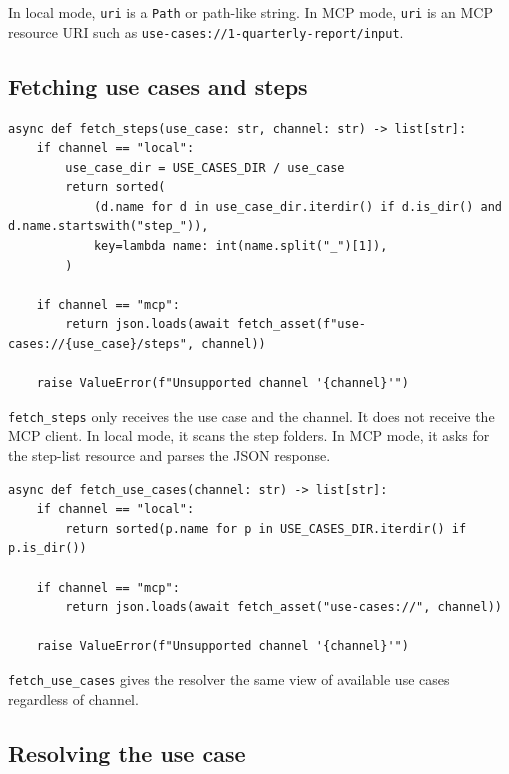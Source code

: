 \documentclass[12pt, a4paper]{article}
\begin{document}
In local mode, \texttt{uri} is a \texttt{Path} or path-like string. In MCP mode, \texttt{uri} is an MCP resource URI such as \texttt{use-cases://1-quarterly-report/input}.

\subsection{Fetching use cases and steps}

\begin{lstlisting}[style=pythonstyle]
async def fetch_steps(use_case: str, channel: str) -> list[str]:
    if channel == "local":
        use_case_dir = USE_CASES_DIR / use_case
        return sorted(
            (d.name for d in use_case_dir.iterdir() if d.is_dir() and d.name.startswith("step_")),
            key=lambda name: int(name.split("_")[1]),
        )

    if channel == "mcp":
        return json.loads(await fetch_asset(f"use-cases://{use_case}/steps", channel))

    raise ValueError(f"Unsupported channel '{channel}'")
\end{lstlisting}

\texttt{fetch\_steps} only receives the use case and the channel. It does not receive the MCP client. In local mode, it scans the step folders. In MCP mode, it asks for the step-list resource and parses the JSON response.

\begin{lstlisting}[style=pythonstyle]
async def fetch_use_cases(channel: str) -> list[str]:
    if channel == "local":
        return sorted(p.name for p in USE_CASES_DIR.iterdir() if p.is_dir())

    if channel == "mcp":
        return json.loads(await fetch_asset("use-cases://", channel))

    raise ValueError(f"Unsupported channel '{channel}'")
\end{lstlisting}

\texttt{fetch\_use\_cases} gives the resolver the same view of available use cases regardless of channel.

\subsection{Resolving the use case}
\end{document}
